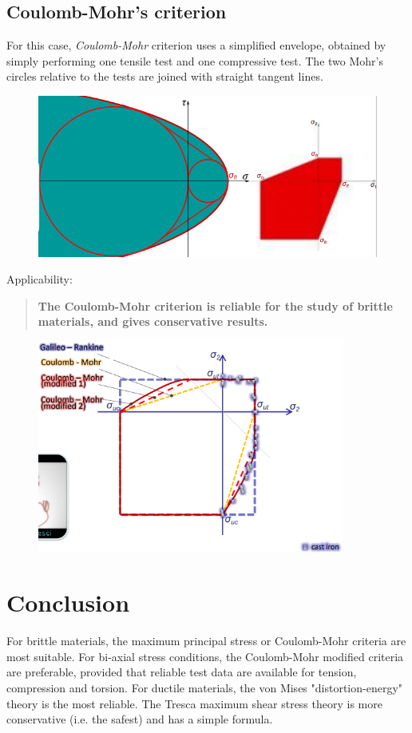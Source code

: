 \documentclass[class=report, crop=false, 12pt,a4paper]{standalone}
\begin{document}
\subsection{Coulomb-Mohr's criterion}
For this case, \textit{Coulomb-Mohr} criterion uses a simplified envelope, obtained by simply performing one tensile test and one compressive test. The two Mohr's circles relative to the tests are joined with straight tangent lines.
\begin{figure}[H]
  \centering
  \includegraphics[width = \textwidth]{../img/diagram100.png}
  \caption{}
\end{figure}
Applicability:
\begin{quotation}
  \textbf{The Coulomb-Mohr criterion is reliable for the study of brittle materials, and gives conservative results.}
\end{quotation}
\begin{figure}[H]
  \centering
  \includegraphics[height = 7cm]{../img/diagram101.png}
  \caption{}
\end{figure}
\section{Conclusion}
For brittle materials, the maximum principal stress or Coulomb-Mohr criteria are most suitable. For bi-axial stress conditions, the Coulomb-Mohr modified criteria are preferable, provided that reliable test data are available for tension, compression and torsion. For ductile materials, the von Mises "distortion-energy" theory is the most reliable. The Tresca maximum shear stress theory is more conservative (i.e. the safest) and has a simple formula.
\end{document}
